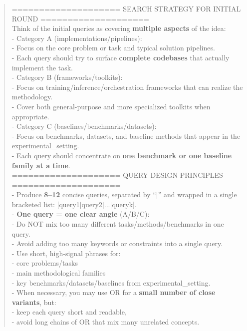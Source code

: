 \begin{quote}
\begin{tcolorbox}[breakable,colback=search!20!white, colframe=search!60!black, title=\textbf{Prompt for Search Agent (Query Generation - Code)}]
        ==================== SEARCH STRATEGY FOR INITIAL ROUND ====================\\
        Think of the initial queries as covering \textbf{multiple aspects} of the idea:\\

        - Category A (implementations/pipelines):\\
        - Focus on the core problem or task and typical solution pipelines.\\
        - Each query should try to surface \textbf{complete codebases} that actually implement the task.\\

        - Category B (frameworks/toolkits):\\
        - Focus on training/inference/orchestration frameworks that can realize the methodology.\\
        - Cover both general-purpose and more specialized toolkits when appropriate.\\

        - Category C (baselines/benchmarks/datasets):\\
        - Focus on benchmarks, datasets, and baseline methods that appear in the experimental\_setting.\\
        - Each query should concentrate on \textbf{one benchmark or one baseline family at a time}.\\

        ==================== QUERY DESIGN PRINCIPLES ====================\\
        - Produce \textbf{8–12} concise queries, separated by ``$\mid$'' and wrapped in a single bracketed list: [query1$\mid$query2$\mid$...$\mid$queryk].\\
        - \textbf{One query = one clear angle} (A/B/C):\\
        - Do NOT mix too many different tasks/methods/benchmarks in one query.\\
        - Avoid adding too many keywords or constraints into a single query.\\
        - Use short, high-signal phrases for:\\
        - core problems/tasks \\
        - main methodological families\\
        - key benchmarks/datasets/baselines from experimental\_setting.\\
        - When necessary, you may use OR for a \textbf{small number of close variants}, but:\\
        - keep each query short and readable,\\
        - avoid long chains of OR that mix many unrelated concepts.\\


\end{tcolorbox}
\end{quote}
